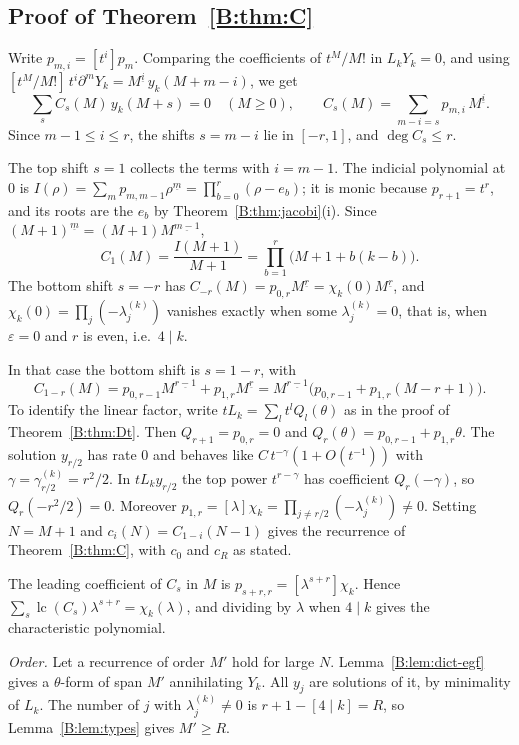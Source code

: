 \documentclass[11pt,a4paper]{article}
\theoremstyle{definition}
\theoremstyle{remark}
\newcommand{\ff}[2]{#1^{\underline{#2}}}
\DeclareMathOperator{\lc}{lc}
\numberwithin{equation}{section}
\begin{document}
\subsection{Proof of Theorem~\ref{B:thm:C}}
Write $p_{m,i}=[t^i]p_m$. Comparing the coefficients of $t^M/M!$ in $L_kY_k=0$, and using $[t^M/M!]\,t^i\partial^mY_k=\ff{M}{i}\,y_k(M+m-i)$, we get
\begin{equation}\label{B:eq:egf-rec}
\sum_{s}C_s(M)\,y_k(M+s)=0\quad(M\ge0),\qquad C_s(M)=\sum_{m-i=s}p_{m,i}\,\ff{M}{i}.
\end{equation}
Since $m-1\le i\le r$, the shifts $s=m-i$ lie in $[-r,1]$, and $\deg C_s\le r$.

The top shift $s=1$ collects the terms with $i=m-1$. The indicial polynomial at $0$ is $I(\rho)=\sum_mp_{m,m-1}\ff{\rho}{m}=\prod_{b=0}^r(\rho-e_b)$; it is monic because $p_{r+1}=t^r$, and its roots are the $e_b$ by Theorem~\ref{B:thm:jacobi}(i). Since $\ff{(M+1)}{m}=(M+1)\ff{M}{m-1}$,
\[
C_1(M)=\frac{I(M+1)}{M+1}=\prod_{b=1}^{r}\bigl(M+1+b(k-b)\bigr).
\]
The bottom shift $s=-r$ has $C_{-r}(M)=p_{0,r}\ff{M}{r}=\chi_k(0)\ff{M}{r}$, and $\chi_k(0)=\prod_j(-\lambda^{(k)}_j)$ vanishes exactly when some $\lambda^{(k)}_j=0$, that is, when $\varepsilon=0$ and $r$ is even, i.e.\ $4\mid k$.

In that case the bottom shift is $s=1-r$, with
\[
C_{1-r}(M)=p_{0,r-1}\ff{M}{r-1}+p_{1,r}\ff{M}{r}=\ff{M}{r-1}\bigl(p_{0,r-1}+p_{1,r}(M-r+1)\bigr).
\]
To identify the linear factor, write $tL_k=\sum_lt^lQ_l(\theta)$ as in the proof of Theorem~\ref{B:thm:Dt}. Then $Q_{r+1}=p_{0,r}=0$ and $Q_r(\theta)=p_{0,r-1}+p_{1,r}\theta$. The solution $y_{r/2}$ has rate $0$ and behaves like $C\,t^{-\gamma}(1+O(t^{-1}))$ with $\gamma=\gamma^{(k)}_{r/2}=r^2/2$. In $tL_ky_{r/2}$ the top power $t^{r-\gamma}$ has coefficient $Q_r(-\gamma)$, so $Q_r(-r^2/2)=0$. Moreover $p_{1,r}=[\lambda]\chi_k=\prod_{j\ne r/2}(-\lambda^{(k)}_j)\ne0$. Setting $N=M+1$ and $c_i(N)=C_{1-i}(N-1)$ gives the recurrence of Theorem~\ref{B:thm:C}, with $c_0$ and $c_R$ as stated.

The leading coefficient of $C_s$ in $M$ is $p_{s+r,r}=[\lambda^{s+r}]\chi_k$. Hence $\sum_s\lc(C_s)\lambda^{s+r}=\chi_k(\lambda)$, and dividing by $\lambda$ when $4\mid k$ gives the characteristic polynomial.

\emph{Order.} Let a recurrence of order $M'$ hold for large $N$. Lemma~\ref{B:lem:dict-egf} gives a $\theta$-form of span $M'$ annihilating $Y_k$. All $y_j$ are solutions of it, by minimality of $L_k$. The number of $j$ with $\lambda^{(k)}_j\ne0$ is $r+1-[4\mid k]=R$, so Lemma~\ref{B:lem:types} gives $M'\ge R$.
\end{document}
